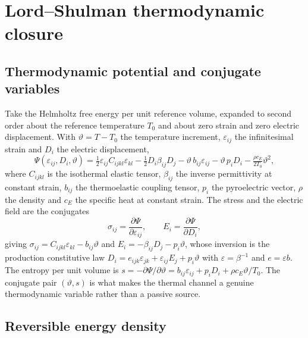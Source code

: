 \documentclass[11pt]{article}
\newcommand{\s}{\sigma}
\newcommand{\eps}{\varepsilon}
\newcommand{\bth}{\vartheta}
\theoremstyle{plain}
\begin{document}

\section{Lord--Shulman thermodynamic closure}
\label{sec:ls-closure}

\subsection{Thermodynamic potential and conjugate variables}

Take the Helmholtz free energy per unit reference volume, expanded to second
order about the reference temperature $T_0$ and about zero strain and zero
electric displacement. With $\bth=T-T_0$ the temperature increment,
$\eps_{ij}$ the infinitesimal strain and $D_i$ the electric displacement,
\begin{equation}
\Psi(\eps_{ij},D_i,\bth)
 = \tfrac12 \eps_{ij}C_{ijkl}\eps_{kl}
 - \tfrac12 D_i \beta_{ij}D_j
 - \bth\, b_{ij}\eps_{ij}
 - \bth\, p_i D_i
 - \tfrac{\rho c_E}{2T_0}\bth^2 ,
\label{eq:psi}
\end{equation}
where $C_{ijkl}$ is the isothermal elastic tensor, $\beta_{ij}$ the inverse
permittivity at constant strain, $b_{ij}$ the thermoelastic coupling tensor,
$p_i$ the pyroelectric vector, $\rho$ the density and $c_E$ the specific heat at
constant strain. The stress and the electric field are the conjugates
\begin{equation}
\s_{ij}=\frac{\partial\Psi}{\partial\eps_{ij}}, \qquad
E_i=\frac{\partial\Psi}{\partial D_i},
\end{equation}
giving $\s_{ij}=C_{ijkl}\eps_{kl}-b_{ij}\bth$ and
$E_i=-\beta_{ij}D_j-p_i\bth$, whose inversion is the production constitutive
law $D_i=e_{ijk}\eps_{jk}+\eps_{ij}E_j+p_i\bth$ with $\eps=\beta^{-1}$ and
$e=\eps b$. The entropy per unit volume is
$s=-\partial\Psi/\partial\bth = b_{ij}\eps_{ij}+p_iD_i+\rho c_E\bth/T_0$.
The conjugate pair $(\bth,s)$ is what makes the thermal channel a genuine
thermodynamic variable rather than a passive source.

\subsection{Reversible energy density}
\end{document}
